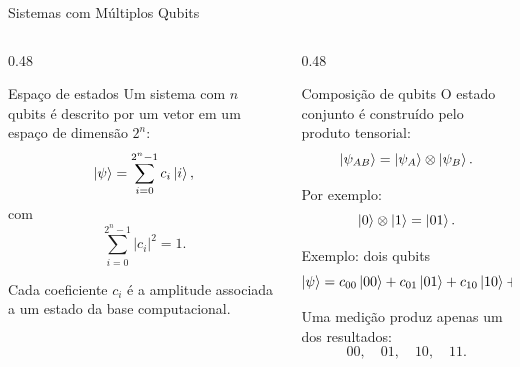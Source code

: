 \begin{frame}{Sistemas com Múltiplos Qubits}

  \begin{columns}[T,onlytextwidth]

  \begin{column}{0.48\textwidth}

  \begin{block}{Espaço de estados}
  Um sistema com $n$ qubits é descrito por um vetor em um espaço de
  dimensão $2^n$:
  \[
    \ket{\psi}
    =
    \sum_{i=0}^{2^n-1}
    c_i\ket{i},
  \]
  com
  \[
    \sum_{i=0}^{2^n-1}|c_i|^2=1.
  \]

  Cada coeficiente $c_i$ é a amplitude associada a um estado da base
  computacional.
  \end{block}

  \end{column}

  \begin{column}{0.48\textwidth}

  \begin{block}{Composição de qubits}
  O estado conjunto é construído pelo produto tensorial:
  \[
    \ket{\psi_{AB}}
    =
    \ket{\psi_A}\otimes\ket{\psi_B}.
  \]

  Por exemplo:
  \[
    \ket{0}\otimes\ket{1}
    =
    \ket{01}.
  \]
  \end{block}

  \begin{exampleblock}{Exemplo: dois qubits}
  \[
  \ket{\psi}
  =
  c_{00}\ket{00}
  +
  c_{01}\ket{01}
  +
  c_{10}\ket{10}
  +
  c_{11}\ket{11}.
  \]

  Uma medição produz apenas um dos resultados:
  \[
  00,\quad 01,\quad 10,\quad 11.
  \]
  \end{exampleblock}

  \end{column}

  \end{columns}

\end{frame}

